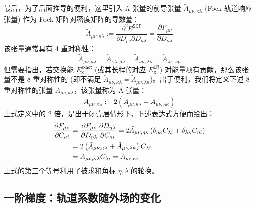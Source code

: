 最后，为了后面推导的便利，这里引入 A 张量的前导张量 $\tilde A_{\mu \nu, \kappa \lambda}$ (Fock 轨道响应张量) 作为 Fock 矩阵对密度矩阵的导数量：
\begin{equation}
  \label{eq.3.def.Auvkl-pre}
  \tilde A_{\mu \nu, \kappa \lambda} := \frac{\partial^2 E^\textsf{SCF}}{\partial D_{\mu \nu} \partial D_{\kappa \lambda}} = \frac{\partial F_{\mu \nu}}{\partial D_{\kappa \lambda}}
\end{equation}
该张量通常具有 4 重对称性：
\begin{equation*}
  \tilde A_{\mu \nu, \kappa \lambda} = \tilde A_{\kappa \lambda, \mu \nu} = \tilde A_{\nu \mu, \lambda \kappa} = \tilde A_{\lambda \kappa, \nu \mu}
\end{equation*}
但需要指出，若交换能 $E_\mathrm{x}^\textsf{exact}$ (或其长程的对应 $E_\mathrm{x}^\textsf{LR}$) 对能量项有贡献，那么该张量不是 8 重对称性的 (即不满足 $\tilde A_{\mu \nu, \kappa \lambda} = \tilde A_{\mu \nu, \lambda \kappa}$)。出于便利，我们将定义下述 8 重对称性的张量 $A_{\mu \nu, \kappa \lambda}$，该张量称为 A 张量：
\begin{equation}
  \label{eq.3.def.Auvkl}
  A_{\mu \nu, \kappa \lambda} := 2 \left( \tilde A_{\mu \nu, \kappa \lambda} + \tilde A_{\mu \nu, \lambda \kappa} \right)
\end{equation}
上式定义中的 2 倍，是出于闭壳层情形下，下述表达式方便而给出：
\begin{align}
  \frac{\partial F_{\mu \nu}}{\partial C_{\kappa i}} &= \frac{\partial F_{\mu \nu}}{\partial D_{\eta \lambda}} \frac{\partial D_{\eta \lambda}}{\partial C_{\kappa i}}
  = 2 \tilde A_{\mu \nu, \eta \kappa} \left( \delta_{\eta \kappa} C_{\lambda i} + \delta_{\lambda \kappa} C_{\eta i} \right) \notag\\
  &= 2 \left( \tilde A_{\mu \nu, \kappa \lambda} + \tilde A_{\mu \nu, \lambda \kappa} \right) C_{\lambda i} \notag\\
  &= A_{\mu \nu, \kappa \lambda} C_{\lambda i} = A_{\mu \nu, \kappa i}
\end{align}
上式的第三个等号利用了被求和角标 $\eta, \lambda$ 的轮换。

\subsection{一阶梯度：轨道系数随外场的变化}

